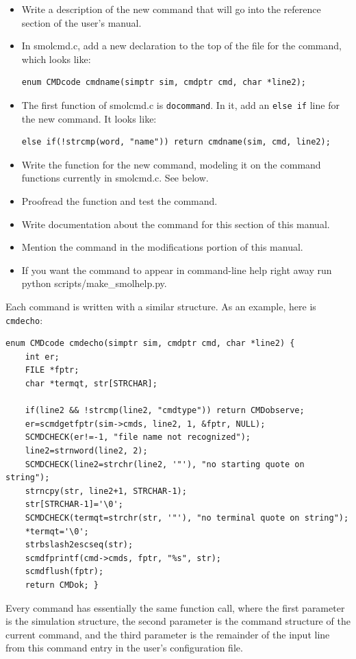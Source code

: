 \documentclass {scrbook}
\newcommand {\ttt} {\texttt}
\begin{document}
\begin{itemize}
\item Write a description of the new command that will go into the reference section of the user's manual.
\item In smolcmd.c, add a new declaration to the top of the file for the command, which looks like:
\begin{lstlisting}
enum CMDcode cmdname(simptr sim, cmdptr cmd, char *line2);
\end{lstlisting}
\item The first function of smolcmd.c is \ttt{docommand}. In it, add an \ttt{else if} line for the new command. It looks like:
\begin{lstlisting}
else if(!strcmp(word, "name")) return cmdname(sim, cmd, line2);
\end{lstlisting}
\item Write the function for the new command, modeling it on the command functions currently in smolcmd.c. See below.
\item Proofread the function and test the command.
\item Write documentation about the command for this section of this manual.
\item Mention the command in the modifications portion of this manual.
\item If you want the command to appear in command-line help right away run python scripts/make\_smolhelp.py.
\end{itemize}

Each command is written with a similar structure. As an example, here is \ttt{cmdecho}:

\begin{lstlisting}
enum CMDcode cmdecho(simptr sim, cmdptr cmd, char *line2) {
	int er;
	FILE *fptr;
	char *termqt, str[STRCHAR];

	if(line2 && !strcmp(line2, "cmdtype")) return CMDobserve;
	er=scmdgetfptr(sim->cmds, line2, 1, &fptr, NULL);
	SCMDCHECK(er!=-1, "file name not recognized");
	line2=strnword(line2, 2);
	SCMDCHECK(line2=strchr(line2, '"'), "no starting quote on string");
	strncpy(str, line2+1, STRCHAR-1);
	str[STRCHAR-1]='\0';
	SCMDCHECK(termqt=strchr(str, '"'), "no terminal quote on string");
	*termqt='\0';
	strbslash2escseq(str);
	scmdfprintf(cmd->cmds, fptr, "%s", str);
	scmdflush(fptr);
	return CMDok; }
\end{lstlisting}

Every command has essentially the same function call, where the first parameter is the simulation structure, the second parameter is the command structure of the current command, and the third parameter is the remainder of the input line from this command entry in the user's configuration file.
\end{document}
